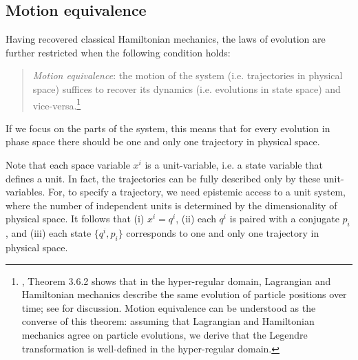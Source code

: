 \documentclass[12pt, twoside]{article}
\newcommand\bs{\begin{singlespace}}
\newcommand\es{\end{singlespace}}
\begin{document}
\subsection{Motion equivalence}
\label{motion}

Having recovered classical Hamiltonian mechanics, the laws of evolution are further restricted when the following condition holds:


\begin{quotation}
\bs \noindent
\textit{Motion equivalence}: the motion of the system (i.e. trajectories in physical space) suffices to recover its dynamics (i.e. evolutions in state space) and vice-versa.\footnote{ \textcites[218]{Abraham}, Theorem 3.6.2 shows that in the hyper-regular domain, Lagrangian and Hamiltonian mechanics describe the same evolution of particle positions over time; see \textcites[1180-1181]{Barrett2} for discussion. Motion equivalence can be understood as the converse of this theorem: assuming that Lagrangian and Hamiltonian mechanics agree on particle evolutions, we derive that the Legendre transformation is well-defined in the hyper-regular domain.} \es
\end{quotation}


\noindent If we focus on the parts of the system, this means that for every evolution in phase space there should be one and only one trajectory in physical space. 

Note that each space variable $x^i$ is a unit-variable, i.e. a state variable that defines a unit. In fact, the trajectories can be fully described only by these unit-variables. For, to specify a trajectory, we need epistemic access to a unit system, where the number of independent units is determined by the dimensionality of physical space. It follows that (i) $x^i = q^i$, (ii) each $q^i$ is paired with a conjugate $p_i$, and (iii) each state $\{q^i, p_i\}$ corresponds to one and only one trajectory in physical space. 
\end{document}
